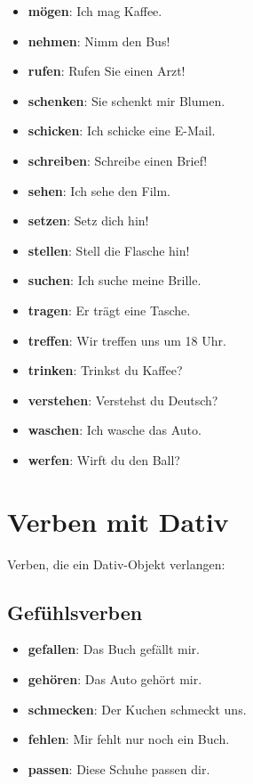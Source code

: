 \begin{itemize}
    \item \textbf{mögen}: Ich mag Kaffee.
    \item \textbf{nehmen}: Nimm den Bus!
    \item \textbf{rufen}: Rufen Sie einen Arzt!
    \item \textbf{schenken}: Sie schenkt mir Blumen.
    \item \textbf{schicken}: Ich schicke eine E-Mail.
    \item \textbf{schreiben}: Schreibe einen Brief!
    \item \textbf{sehen}: Ich sehe den Film.
    \item \textbf{setzen}: Setz dich hin!
    \item \textbf{stellen}: Stell die Flasche hin!
    \item \textbf{suchen}: Ich suche meine Brille.
    \item \textbf{tragen}: Er trägt eine Tasche.
    \item \textbf{treffen}: Wir treffen uns um 18 Uhr.
    \item \textbf{trinken}: Trinkst du Kaffee?
    \item \textbf{verstehen}: Verstehst du Deutsch?
    \item \textbf{waschen}: Ich wasche das Auto.
    \item \textbf{werfen}: Wirft du den Ball?
\end{itemize}

\section{Verben mit Dativ}
\label{sec:VerbenMitDat}

Verben, die ein Dativ-Objekt verlangen:

\subsection{Gefühlsverben}
\begin{itemize}
    \item \textbf{gefallen}: Das Buch gefällt mir.
    \item \textbf{gehören}: Das Auto gehört mir.
    \item \textbf{schmecken}: Der Kuchen schmeckt uns.
    \item \textbf{fehlen}: Mir fehlt nur noch ein Buch.
    \item \textbf{passen}: Diese Schuhe passen dir.
\end{itemize}

